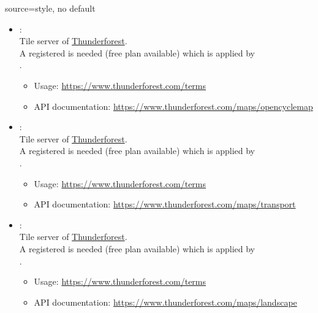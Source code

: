 \begin{docMrcKey}[supply]{source}{=}{style, no default}
\begin{itemize}
\clearpage
  \item{}:\\
    Tile server of \href{https://www.thunderforest.com}{Thunderforest}.\\
    A registered  is needed (free plan available)
    which is applied by\\
    .
    \begin{itemize}
    \item Usage: \url{https://www.thunderforest.com/terms}
    \item API documentation: \url{https://www.thunderforest.com/maps/opencyclemap}
    \end{itemize}

  \item{}:\\
    Tile server of \href{https://www.thunderforest.com}{Thunderforest}.\\
    A registered  is needed (free plan available)
    which is applied by\\
    .
    \begin{itemize}
    \item Usage: \url{https://www.thunderforest.com/terms}
    \item API documentation: \url{https://www.thunderforest.com/maps/transport}
    \end{itemize}

  \item{}:\\
    Tile server of \href{https://www.thunderforest.com}{Thunderforest}.\\
    A registered  is needed (free plan available)
    which is applied by\\
    .
    \begin{itemize}
    \item Usage: \url{https://www.thunderforest.com/terms}
    \item API documentation: \url{https://www.thunderforest.com/maps/landscape}
    \end{itemize}


\end{itemize}
\end{docMrcKey}
